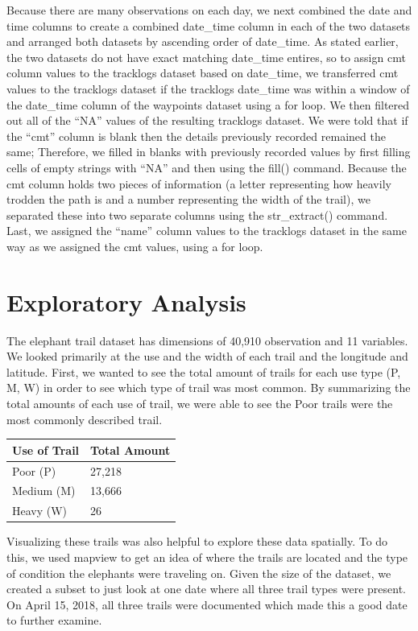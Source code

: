 \documentclass[12pt,]{article}
\begin{document}
Because there are many observations on each day, we next combined the
date and time columns to create a combined date\_time column in each of
the two datasets and arranged both datasets by ascending order of
date\_time. As stated earlier, the two datasets do not have exact
matching date\_time entires, so to assign cmt column values to the
tracklogs dataset based on date\_time, we transferred cmt values to the
tracklogs dataset if the tracklogs date\_time was within a window of the
date\_time column of the waypoints dataset using a for loop. We then
filtered out all of the ``NA'' values of the resulting tracklogs
dataset. We were told that if the ``cmt'' column is blank then the
details previously recorded remained the same; Therefore, we filled in
blanks with previously recorded values by first filling cells of empty
strings with ``NA'' and then using the fill() command. Because the cmt
column holds two pieces of information (a letter representing how
heavily trodden the path is and a number representing the width of the
trail), we separated these into two separate columns using the
str\_extract() command. Last, we assigned the ``name'' column values to
the tracklogs dataset in the same way as we assigned the cmt values,
using a for loop.

\newpage

\hypertarget{exploratory-analysis}{%
\section{Exploratory Analysis}\label{exploratory-analysis}}

The elephant trail dataset has dimensions of 40,910 observation and 11
variables. We looked primarily at the use and the width of each trail
and the longitude and latitude. First, we wanted to see the total amount
of trails for each use type (P, M, W) in order to see which type of
trail was most common. By summarizing the total amounts of each use of
trail, we were able to see the Poor trails were the most commonly
described trail.

\begin{longtable}[]{@{}ll@{}}
\toprule
\textbf{Use of Trail } & \textbf{Total Amount}\tabularnewline
\midrule
\endhead
Poor (P) & 27,218\tabularnewline
Medium (M) & 13,666\tabularnewline
Heavy (W) & 26\tabularnewline
\bottomrule
\end{longtable}

Visualizing these trails was also helpful to explore these data
spatially. To do this, we used mapview to get an idea of where the
trails are located and the type of condition the elephants were
traveling on. Given the size of the dataset, we created a subset to just
look at one date where all three trail types were present. On April 15,
2018, all three trails were documented which made this a good date to
further examine.
\end{document}
